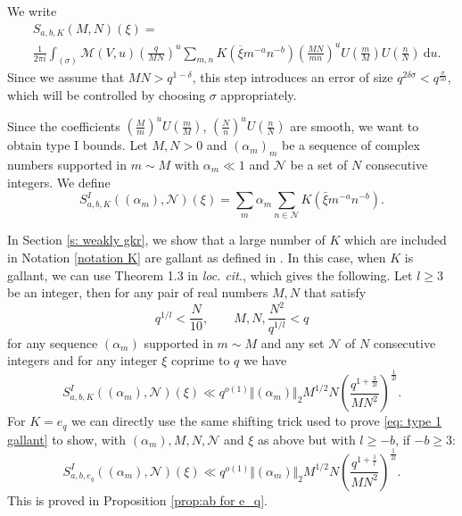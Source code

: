 \documentclass[12pt]{amsart}
\theoremstyle{plain}
\theoremstyle{definition}
\theoremstyle{remark}
\numberwithin{equation}{section}
\renewcommand{\geq}{\geqslant}
\begin{document}
 We write 
\begin{align}\label{eq : mellintrick}&S_{a,b,K}(M,N)(\xi) = \nonumber\\& \frac{1}{2\pi i}\int_{(\sigma)}\mathcal{M}(V,u)\left(\frac{q}{MN}\right)^u\sum_{m,n}K(\overline{\xi}m^{-a}n^{-b})\left(\frac{MN}{mn}\right)^u U\left(\frac{m}{M}\right)U\left(\frac{n}{N}\right) \ \mathrm{d}u. \end{align}
Since we assume that $MN>q^{1-\delta}$, this step introduces an error of size $q^{2\delta \sigma}< q^{\frac{   \sigma }{50}}$, which will be controlled by choosing $\sigma$ appropriately. 

Since the coefficients $(\frac{M}{m})^u U\left(\frac{m}{M}\right)$, $(\frac{N}{n})^u U\left(\frac{n}{N}\right)$ are smooth, we want to obtain type I bounds. Let $M,N>0$ and $(\alpha_m)_m$ be a sequence of complex numbers supported in $m\sim M$ with $\alpha_m \ll 1$ and $\mathcal{N}$ be a set of $N$ consecutive integers. We define 
\begin{equation}\label{eq: def S^I}
    S^{I}_{a,b,K}((\alpha_m),\mathcal{N})(\xi) = \sum_{m}\alpha_m\sum_{n\in \mathcal{N}}K(\bar \xi m^{-a}n^{-b}).
\end{equation}


In Section \ref{s: weakly gkr}, we show that a large number of $K$ which are included in Notation \ref{notation K} are gallant as defined in \cite{FKMSbilinear}. In this case, when $K$ is gallant, we can use Theorem 1.3 in \emph{loc. cit.}, which gives the following. Let $l\geq 3$ be an integer, then for any pair of real numbers $M,N$ that satisfy \[ q^{1/l}<\frac{N}{10}, \qquad M,N,\frac{N^2}{q^{1/l}} <q \]
for any sequence $(\alpha_m)$ supported in $m\sim M$ and any set $\mathcal{N}$ of $N$ consecutive integers and for any integer $\xi$ coprime to $q$ we have 
\begin{equation}\label{eq: type 1 gallant}
    S^I_{a,b,K}( (\alpha_m),\mathcal{N})(\xi) \ll q^{o(1)}\Vert (\alpha_m) \Vert_2 M^{1/2}N\left(\frac{q^{1+\frac{3}{2l}}}{MN^2} \right)^{\frac{1}{2l}}.
 \end{equation}
For $K = e_q$ we can directly use the same shifting trick used to prove \eqref{eq: type 1 gallant} to show, with $(\alpha_m),M,N,\mathcal{N}$ and $\xi$ as above but with $l\geq -b$, if $-b\geq 3$:
\begin{equation}\label{eq: type 1 eq}
    S^I_{a,b,e_q}((\alpha_m),\mathcal{N})(\xi) \ll q^{o(1)}\Vert  (\alpha_m) \Vert_2 M^{1/2}N\left(\frac{q^{1+\frac{1}{l}}}{MN^2} \right)^{\frac{1}{2l}}.
\end{equation}
  This is proved in Proposition \ref{prop:ab for e_q}. 
\end{document}
